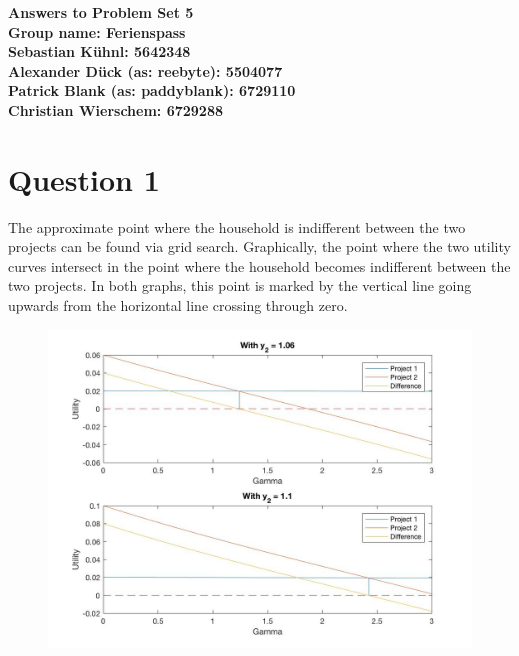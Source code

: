 \documentclass{article}
\begin{document}
\begin{center}
\LARGE \bfseries{Answers to Problem Set 5}\\
 Group name: Ferienspass\vspace{.5cm}\\
 \normalsize \normalfont
  Sebastian K\"uhnl: 5642348\\
  Alexander D\"uck (as: reebyte): 5504077\\
  Patrick Blank (as: paddyblank): 6729110\\
  Christian Wierschem: 6729288
\end{center}
\normalsize	
\section{Question 1}
The approximate point where the household is indifferent between the two projects can be found via grid search. Graphically, the point where the two utility curves intersect in the point where the household becomes indifferent between the two projects. In both graphs, this point is marked by the vertical line going upwards from the horizontal line crossing through zero.
\begin{figure}[h]
\includegraphics[width = \textwidth, keepaspectratio]{PS5Q2Sub3_Utility.jpg} 
\end{figure}
\end{document}
